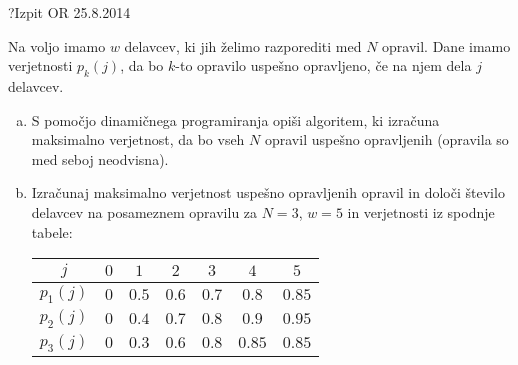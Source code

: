\begin{naloga}{?}{Izpit OR 25.8.2014}
\begin{vprasanje}
Na voljo imamo $w$ delavcev, ki jih želimo razporediti med $N$ opravil.
Dane imamo verjetnosti $p_k(j)$,
da bo $k$-to opravilo uspešno opravljeno, če na njem dela $j$ delavcev.

\begin{enumerate}[(a)]
\item S pomočjo dinamičnega programiranja opiši algoritem,
ki izračuna maksimalno verjetnost,
da bo vseh $N$ opravil uspešno opravljenih (opravila so med seboj neodvisna).

\item Izračunaj maksimalno verjetnost uspešno opravljenih opravil
in določi število delavcev na posameznem opravilu
za $N = 3$, $w = 5$ in verjetnosti iz spodnje tabele:
\begin{center}
\begin{tabular}{c|cccccc}
$j$ & $0$ & $1$ & $2$ & $3$ & $4$ & $5$ \\ \hline
$p_1(j)$ & $0$ & $0.5$ & $0.6$ & $0.7$ & $0.8$  & $0.85$ \\
$p_2(j)$ & $0$ & $0.4$ & $0.7$ & $0.8$ & $0.9$  & $0.95$ \\
$p_3(j)$ & $0$ & $0.3$ & $0.6$ & $0.8$ & $0.85$ & $0.85$
\end{tabular}
\end{center}
\end{enumerate}
\end{vprasanje}
\begin{odgovor}
\end{odgovor}
\end{naloga}
